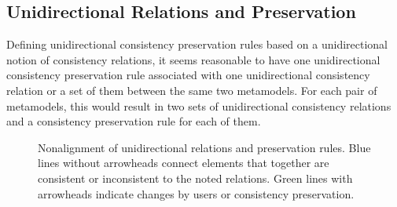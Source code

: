 \subsection{Unidirectional Relations and Preservation} %
\label{chap:synchronization:gap:alignment}

Defining unidirectional consistency preservation rules based on a unidirectional notion of consistency relations, it seems reasonable to have one unidirectional consistency preservation rule associated with one unidirectional consistency relation or a set of them between the same two metamodels.
For each pair of metamodels, this would result in two sets of unidirectional consistency relations and a consistency preservation rule for each of them.

\begin{figure}
    \centering
    
    \caption[Nonalignment of unidirectional relations and preservation]{Nonalignment of unidirectional relations and preservation rules. Blue lines without arrowheads connect elements that together are consistent or inconsistent to the noted relations. Green lines with arrowheads indicate changes by users or consistency preservation.
    }
    \label{fig:synchronization:unidirectional_nonalignment}
\end{figure}

